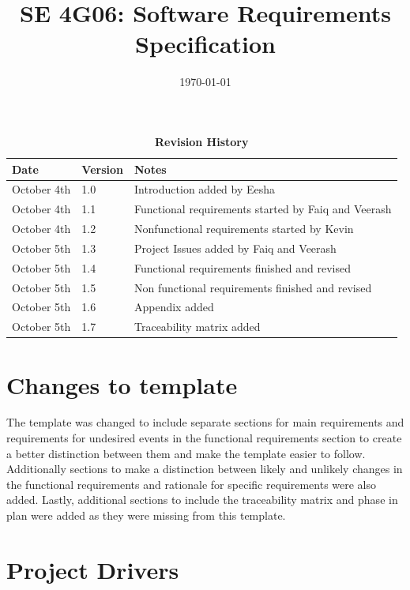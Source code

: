 \documentclass[12pt, titlepage]{article}
\title{SE 4G06: Software Requirements Specification\\\progname}
\author{\authname}
\date{\today}
\begin{document}
	
	\maketitle
	
	\tableofcontents
	\listoftables
	\listoffigures
	
	\begin{table}[H]
		\caption{\bf Revision History}
		\begin{tabularx}{\textwidth}{p{3cm}p{2cm}X}
			\toprule {\bf Date} & {\bf Version} & {\bf Notes}\\
			\midrule
			October 4th & 1.0 & Introduction added by Eesha\\
			October 4th & 1.1 & Functional requirements started by Faiq and Veerash\\
			October 4th & 1.2 & Nonfunctional requirements started by Kevin\\
			October 5th & 1.3 & Project Issues added by Faiq and Veerash \\
			October 5th & 1.4 & Functional requirements finished and revised \\
			October 5th & 1.5 & Non functional requirements finished and revised \\
			October 5th & 1.6 & Appendix added\\
			October 5th & 1.7 & Traceability matrix added\\
			\bottomrule
		\end{tabularx}
	\end{table}
	
	\newpage
	
	
	\section{Changes to template}
	
	The template was changed to include separate sections for main requirements and requirements for undesired events in the functional requirements section to create a better distinction between them and make the template easier to follow. Additionally sections to make a distinction between likely and unlikely changes in the functional requirements and rationale for specific requirements were also added. Lastly, additional sections to include the traceability matrix and phase in plan were added as they were missing from this template.
	
	\section{Project Drivers}
	
\end{document}
